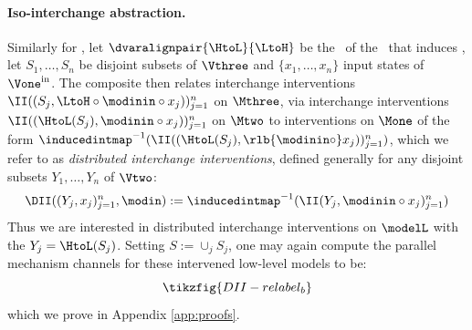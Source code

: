 \documentclass{article}
\begin{document}
\paragraph{Iso-interchange abstraction.} Similarly for \isointabs, let $\dvaralignpair{\HtoL}{\LtoH}$ be the \varalign\ of the \restrictedCCA\ that induces \rlb{$(\LtoH, \LtoHquery)$}, let $S_1,\dots,S_n$ be disjoint subsets of $\Vthree$ and $\{x_1,\dots,x_n\}$ input states of $\Vone^{\text{in}}$. 
The composite \qup{} then relates interchange interventions $\II((S_j,\LtoH \circ \modinin \circ x_j))^n_{j=1}$ on  $\Mthree$, 
via interchange interventions $\II((\HtoL(S_j), \modinin \circ x_j))^n_{j=1}$ on $\Mtwo$ 
to interventions on $\Mone$ of the form $\inducedintmap^{-1}(\II((\HtoL(S_j), \rlb{ \modinin \circ} x_j))^n_{j=1})$, which we refer to as \emph{distributed interchange interventions}, defined generally for any disjoint subsets $Y_1,\dots,Y_n$ of $\Vtwo$:
\[
\DII((Y_j,x_j)^n_{j=1},\modin) := \inducedintmap^{-1}(\II(Y_j,\modinin \circ x_j)^n_{j=1})
\]
Thus we are interested in distributed interchange interventions on $\modelL$ with the $Y_j = \HtoL(S_j)$. Setting $S:=\cup_j S_j$, one may again compute the parallel mechanism channels for these intervened low-level models to be:
\begin{equation} \label{eq:DII-pic}
\tikzfig{DII-relabel_b}
\end{equation}
which we prove in Appendix \ref{app:proofs}. 
\end{document}
